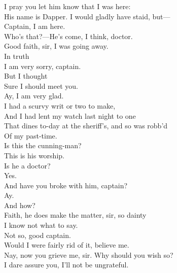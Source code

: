 \documentclass[a4paper,oneside]{memoir}
\begin{document}
\begin{drama*}
I pray you let him know that I was here:\\
His name is Dapper. I would gladly have staid, but---\\
\dapperspeaks {} Captain, I am here.\\
\facespeaks {} Who's that?---He's come, I think, doctor.\\
Good faith, sir, I was going away.\\
\dapperspeaks {} In truth\\
I am very sorry, captain.\\
\facespeaks {} But I thought\\
Sure I should meet you.\\
\dapperspeaks {} Ay, I am very glad.\\
I had a scurvy writ or two to make,\\
And I had lent my watch last night to one\\
That dines to-day at the sheriff's, and so was robb'd\\
Of my past-time.\\
 Is this the cunning-man?\\
\facespeaks This is his worship.\\
\dapperspeaks {} Is he a doctor?\\
\facespeaks {} Yes.\\
\dapperspeaks And have you broke with him, captain?\\
\facespeaks {} Ay.\\
\dapperspeaks {} And how?\\
\facespeaks Faith, he does make the matter, sir, so dainty\\
I know not what to say.\\
\dapperspeaks {} Not so, good captain.\\
\facespeaks Would I were fairly rid of it, believe me.\\
\dapperspeaks Nay, now you grieve me, sir. Why should you wish so?\\
I dare assure you, I'll not be ungrateful.\\

\end{drama*}
\end{document}

